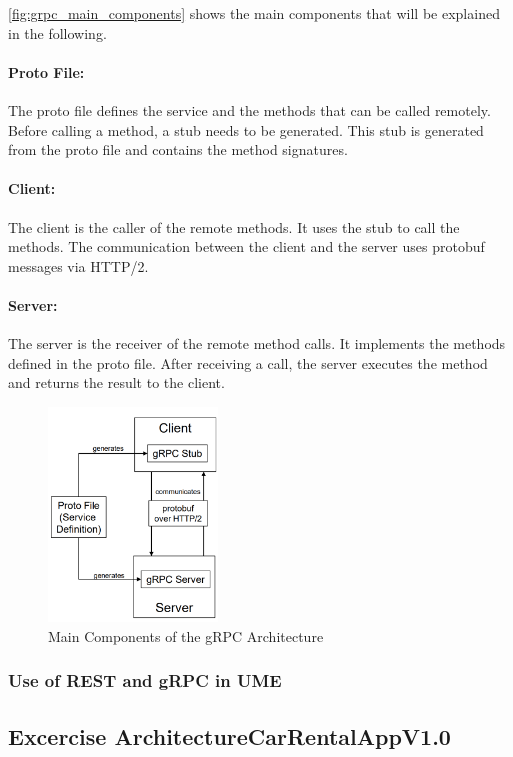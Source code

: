 \autoref{fig:grpc_main_components} shows the main components that will be explained in the following.
\paragraph*{Proto File:}
The proto file defines the service and the methods that can be called remotely.
Before calling a method, a stub needs to be generated.
This stub is generated from the proto file and contains the method signatures.

\paragraph*{Client:}
The client is the caller of the remote methods.
It uses the stub to call the methods.
The communication between the client and the server uses protobuf messages via HTTP/2.

\paragraph*{Server:}
The server is the receiver of the remote method calls.
It implements the methods defined in the proto file.
After receiving a call, the server executes the method and returns the result to the client.

\begin{figure}
    \centering
    \includegraphics[width=0.4\textwidth]{figures/microservices/microservices_grpcMainComponents.png}
    \caption{Main Components of the gRPC Architecture}
    \label{fig:grpc_main_components}
\end{figure}

\subsubsection*{Use of REST and gRPC in UME}

\subsection{Excercise ArchitectureCarRentalAppV1.0}
\label{sec:architecture_car_rental_app_v1_0}

